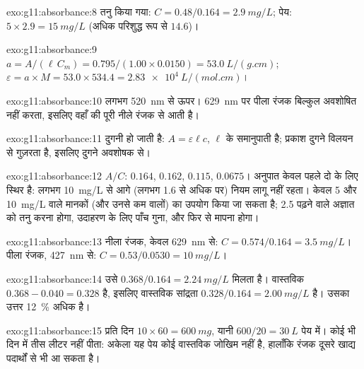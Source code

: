\begin{solution}{exo:g11:absorbance:8}
तनु किया गया: $C = 0.48 / 0.164 = \qty{2.9}{mg/L}$; पेय:
$5 \times 2.9 = \qty{15}{mg/L}$ (अधिक परिशुद्ध रूप से $14.6$)।
\end{solution}

\begin{solution}{exo:g11:absorbance:9}
$a = A / (\ell\, C_m) = 0.795 / (1.00 \times 0.0150) = \qty{53.0}{L/(g.cm)}$;
$\varepsilon = a \times M = 53.0 \times 534.4 = \qty{2.83e4}{L/(mol.cm)}$।
\end{solution}

\begin{solution}{exo:g11:absorbance:10}
लगभग \qty{520}{nm} से ऊपर। \qty{629}{nm} पर पीला रंजक बिल्कुल
अवशोषित नहीं करता, इसलिए वहाँ की पूरी  नीले रंजक से आती है।
\end{solution}

\begin{solution}{exo:g11:absorbance:11}
दुगनी हो जाती है: $A = \varepsilon \ell c$, $\ell$ के समानुपाती है; प्रकाश
दुगने विलयन से गुज़रता है, इसलिए दुगने अवशोषक  से।
\end{solution}

\begin{solution}{exo:g11:absorbance:12}
$A/C$: $0.164$, $0.162$, $0.115$, $0.0675$। अनुपात केवल पहले दो के लिए
स्थिर है: लगभग \qty{10}{mg/L} से आगे (लगभग 1.6 से अधिक  पर)
नियम लागू नहीं रहता। केवल 5 और \qty{10}{mg/L} वाले मानकों (और उनसे कम
वालों) का उपयोग किया जा सकता है; 2.5 पढ़ने वाले अज्ञात को तनु करना होगा, उदाहरण
के लिए पाँच गुना, और फिर से मापना होगा।
\end{solution}

\begin{solution}{exo:g11:absorbance:13}
नीला रंजक, केवल \qty{629}{nm} से: $C = 0.574 / 0.164 = \qty{3.5}{mg/L}$।
पीला रंजक, \qty{427}{nm} से: $C = 0.53 / 0.0530 = \qty{10}{mg/L}$।
\end{solution}

\begin{solution}{exo:g11:absorbance:14}
उसे $0.368 / 0.164 = \qty{2.24}{mg/L}$ मिलता है। वास्तविक 
$0.368 - 0.040 = 0.328$ है, इसलिए वास्तविक सांद्रता
$0.328 / 0.164 = \qty{2.00}{mg/L}$ है। उसका उत्तर \qty{12}{\percent} अधिक है।
\end{solution}

\begin{solution}{exo:g11:absorbance:15}
प्रति दिन $10 \times 60 = \qty{600}{mg}$, यानी $600 / 20 = \qty{30}{L}$
पेय में। कोई भी दिन में तीस लीटर नहीं पीता: अकेला यह पेय कोई वास्तविक जोखिम नहीं
है, हालाँकि रंजक दूसरे खाद्य पदार्थों से भी आ सकता है।
\end{solution}

